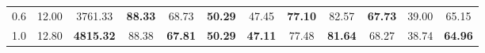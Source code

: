 \begin{table*}[t]
{\begin{tabular}{ccc|ccccccccc}
    0.6 & 12.00 & 3761.33 & \textbf{88.33} & 68.73 & \textbf{50.29} & 47.45 & \textbf{77.10} & 82.57 & \textbf{67.73} & 39.00 & 65.15 \\
    1.0 & 12.80 & \textbf{4815.32} & 88.38 & \textbf{67.81} & \textbf{50.29} & \textbf{47.11} & 77.48 & \textbf{81.64} & 68.27 & 38.74 & \textbf{64.96} \\
    \hline %
    \end{tabular}
    }
\end{table*}
